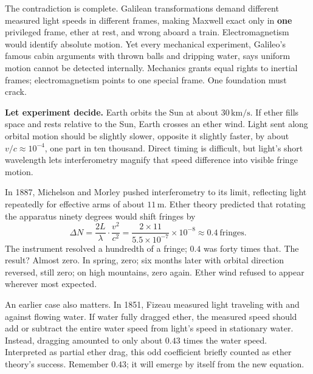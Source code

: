 The contradiction is complete. Galilean transformations demand different measured light speeds in different frames, making Maxwell exact only in \textbf{one} privileged frame, ether at rest, and wrong aboard a train. Electromagnetism would identify absolute motion. Yet every mechanical experiment, Galileo's famous cabin arguments with thrown balls and dripping water, says uniform motion cannot be detected internally. Mechanics grants equal rights to inertial frames; electromagnetism points to one special frame. One foundation must crack.

\textbf{Let experiment decide.} Earth orbits the Sun at about \(30\,\mathrm{km/s}\). If ether fills space and rests relative to the Sun, Earth crosses an ether wind. Light sent along orbital motion should be slightly slower, opposite it slightly faster, by about \(v/c\approx 10^{-4}\), one part in ten thousand. Direct timing is difficult, but light's short wavelength lets interferometry magnify that speed difference into visible fringe motion.

In 1887, Michelson and Morley pushed interferometry to its limit, reflecting light repeatedly for effective arms of about \(11\,\mathrm{m}\). Ether theory predicted that rotating the apparatus ninety degrees would shift fringes by
\[
\Delta N=\frac{2L}{\lambda}\cdot\frac{v^{2}}{c^{2}}
=\frac{2\times11}{5.5\times10^{-7}}\times10^{-8}\approx 0.4\ \text{fringes}.
\]
The instrument resolved a hundredth of a fringe; \(0.4\) was forty times that. The result? Almost zero. In spring, zero; six months later with orbital direction reversed, still zero; on high mountains, zero again. Ether wind refused to appear wherever most expected.

An earlier case also matters. In 1851, Fizeau measured light traveling with and against flowing water. If water fully dragged ether, the measured speed should add or subtract the entire water speed from light's speed in stationary water. Instead, dragging amounted to only about \(0.43\) times the water speed. Interpreted as partial ether drag, this odd coefficient briefly counted as ether theory's success. Remember \(0.43\); it will emerge by itself from the new equation.

\begin{center}
\end{center}

